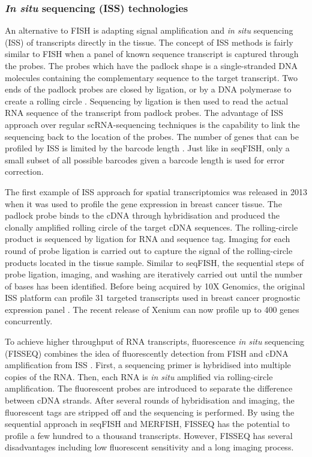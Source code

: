 \subsubsection{\textit{In situ} sequencing (ISS) technologies}
An alternative to FISH is adapting signal amplification and \textit{in situ} sequencing (ISS) of transcripts directly in the tissue. The concept of ISS methods is fairly similar to FISH when a panel of known sequence transcript is captured through the probes. The probes which have the padlock shape is a single-stranded DNA molecules containing the complementary sequence to the target transcript. Two ends of the padlock probes are closed by ligation, or by a DNA polymerase to create a rolling circle \cite{conrad2022single}. Sequencing by ligation is then used to read the actual RNA sequence of the transcript from padlock probes. The advantage of ISS approach over regular scRNA-sequencing techniques is the capability to link the sequencing back to the location of the probes. The number of genes that can be profiled by ISS is limited by the barcode length \cite{williams2022introduction, asp2020spatially}. Just like in seqFISH, only a small subset of all possible barcodes given a barcode length is used for error correction.

The first example of ISS approach for spatial transcriptomics was released in 2013 when it was used to profile the gene expression in breast cancer tissue. The padlock probe binds to the cDNA through hybridisation and produced the  clonally amplified rolling circle of the target cDNA sequences. The rolling-circle product is sequenced by ligation for RNA and sequence tag. Imaging for each round of probe ligation is carried out to capture the signal of the rolling-circle products located in the tissue sample. Similar to seqFISH, the sequential steps of probe ligation, imaging, and washing are iteratively carried out until the number of bases has been identified. Before being acquired by 10X Genomics, the original ISS platform can profile 31 targeted transcripts used in breast cancer prognostic expression panel \cite{ke2013situ}. The recent release of Xenium can now profile up to 400 genes concurrently. 

To achieve higher throughput of RNA transcripts, fluorescence \textit{in situ} sequencing (FISSEQ) combines the idea of fluorescently detection from FISH and cDNA amplification from ISS \cite{lee2015fluorescent}. First, a sequencing primer is hybridised into multiple copies of the RNA. Then, each RNA is \textit{in situ} amplified via rolling-circle amplification. The fluorescent probes are introduced to separate the difference between cDNA strands. After several rounds of hybridisation and imaging, the fluorescent tags are stripped off and the sequencing is performed. By using the sequential approach in seqFISH and MERFISH, FISSEQ has the potential to profile a few hundred to a thousand transcripts. However, FISSEQ has several disadvantages including low fluorescent sensitivity and a long imaging process.  

